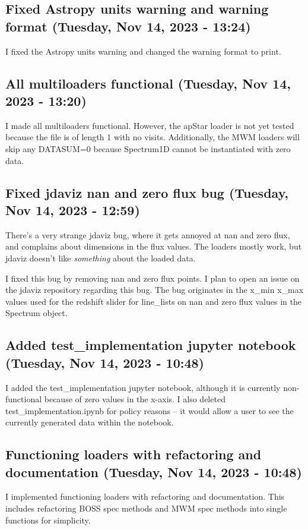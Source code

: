 \documentclass[a4paper]{article}
\begin{document}
\subsection*{Fixed Astropy units warning and warning format (Tuesday, Nov 14, 2023 - 13:24)}
I fixed the Astropy units warning and changed the warning format to print.

\subsection*{All multiloaders functional (Tuesday, Nov 14, 2023 - 13:20)}
I made all multiloaders functional. However, the apStar loader is not yet tested because the file is of length 1 with no visits. Additionally, the MWM loaders will skip any DATASUM=0 because Spectrum1D cannot be instantiated with zero data.

\subsection*{Fixed jdaviz nan and zero flux bug (Tuesday, Nov 14, 2023 - 12:59)}
There's a very strange jdaviz bug, where it gets annoyed at nan and zero flux, and complains about dimensions in the flux values. The loaders mostly work, but jdaviz doesn't like \emph{something} about the loaded data.

I fixed this bug by removing nan and zero flux points. I plan to open an issue on the jdaviz repository regarding this bug. The bug originates in the x\_min x\_max values used for the redshift slider for line\_lists on nan and zero flux values in the Spectrum object.



\subsection*{Added test\_implementation jupyter notebook (Tuesday, Nov 14, 2023 - 10:48)}
I added the test\_implementation jupyter notebook, although it is currently non-functional because of zero values in the x-axis. I also deleted test\_implementation.ipynb for policy reasons -- it would allow a user to see the currently generated data within the notebook.

\subsection*{Functioning loaders with refactoring and documentation (Tuesday, Nov 14, 2023 - 10:48)}
I implemented functioning loaders with refactoring and documentation. This includes refactoring BOSS spec methods and MWM spec methods into single functions for simplicity.
\end{document}

